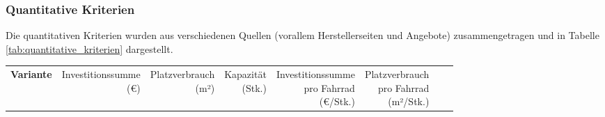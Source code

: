 \newcommand{\naun}[1]{\textbf{\rotatebox{90}{\makecell[l]{#1}}}}

\subsubsection{Quantitative Kriterien}

Die quantitativen Kriterien wurden aus verschiedenen Quellen (vorallem Herstellerseiten und Angebote) zusammengetragen und in Tabelle \ref{tab:quantitative_kriterien} dargestellt.

\pagestyle{empty}

\begin{landscape}
  \begin{longtable}{p{}rrrrrrr}
    \toprule
    \large\textbf{Variante}                            &
    \naun{Investitionssumme                                                                                                                                                                                                                                                                                                        \\(€)}             &
    \naun{Platzverbrauch                                                                                                                                                                                                                                                                                                           \\(m²)}               &
    \naun{Kapazität                                                                                                                                                                                                                                                                                                                \\(Stk.)}            &
    \naun{Investitionssumme                                                                                                                                                                                                                                                                                                        \\pro Fahrrad\\(€/Stk.)} &
    \naun{Platzverbrauch                                                                                                                                                                                                                                                                                                           \\pro Fahrrad\\(m²/Stk.)} &

\end{longtable}
\end{landscape}
